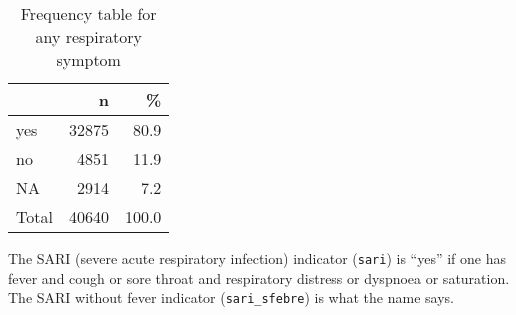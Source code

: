 \documentclass[
]{article}
\newenvironment{Shaded}{\begin{snugshade}}{\end{snugshade}}
\newcommand{\DataTypeTok}[1]{\textcolor[rgb]{0.13,0.29,0.53}{#1}}
\newcommand{\DecValTok}[1]{\textcolor[rgb]{0.00,0.00,0.81}{#1}}
\newcommand{\KeywordTok}[1]{\textcolor[rgb]{0.13,0.29,0.53}{\textbf{#1}}}
\newcommand{\NormalTok}[1]{#1}
\newcommand{\OperatorTok}[1]{\textcolor[rgb]{0.81,0.36,0.00}{\textbf{#1}}}
\newcommand{\OtherTok}[1]{\textcolor[rgb]{0.56,0.35,0.01}{#1}}
\newcommand{\StringTok}[1]{\textcolor[rgb]{0.31,0.60,0.02}{#1}}
\begin{document}
\begin{Shaded}
\end{Shaded}

\begin{table}[!h]

\caption{\label{tab:unnamed-chunk-83}Frequency table for any respiratory symptom}
\centering
\begin{tabular}[t]{l|r|r}
\hline
  & n & \%\\
\hline
yes & 32875 & 80.9\\
\hline
no & 4851 & 11.9\\
\hline
NA & 2914 & 7.2\\
\hline
Total & 40640 & 100.0\\
\hline
\end{tabular}
\end{table}

The SARI (severe acute respiratory infection) indicator (\texttt{sari})
is ``yes'' if one has fever and cough or sore throat and respiratory
distress or dyspnoea or saturation. The SARI without fever indicator
(\texttt{sari\_sfebre}) is what the name says.
\end{document}
